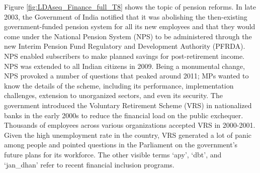 \documentclass[10pt, a4paper]{article}
\begin{document}
Figure \ref{fig:LDAseq_Finance_full_T8} shows the topic of pension reforms.  
In late 2003, the Government of India notified that it was abolishing the then-existing government-funded pension system for all its new employees 
and that they would come under the National Pension System (NPS) to be administered through the new  Interim Pension Fund Regulatory and  Development Authority (PFRDA). NPS enabled subscribers to make planned savings for post-retirement income. NPS was extended to all Indian citizens in 2009.  
Being a monumental change, NPS provoked a number of questions that peaked around 2011; MPs wanted to know the details of the scheme, including its performance, implementation challenges, extension to unorganized sectors, and even its security. The government introduced the Voluntary Retirement Scheme (VRS) in nationalized banks in the early 2000s to reduce the financial load on the public exchequer. Thousands of employees across various  organizations accepted VRS in 2000-2001. Given the high unemployment rate in the country, VRS generated a lot of panic among  people and pointed questions in the Parliament on the government's future plans for its workforce. 
The other visible terms `apy', `dbt', and `jan\_dhan' refer to  recent financial inclusion programs.
       
\end{document}
